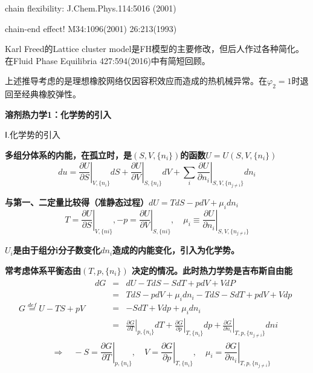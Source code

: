 \documentclass{article} %
\begin{document}
\noindent chain flexibility: J.Chem.Phys.114:5016 (2001)

\noindent chain-end effect! M34:1096(2001) 26:213(1993)

\noindent Karl Freed的Lattice cluster model是FH模型的主要修改，但后人作过各种简化。在Fluid Phase Equilibria 427:594(2016)中有简短回顾。

\noindent 

\noindent 上述推导考虑的是理想橡胶网络仅因容积效应而造成的热机械异常。在$\varphi _{2} =1$时退回至经典橡胶弹性。

\noindent \eject 

\noindent \textbf{溶剂热力学1：化学势的引入}

\noindent Ⅰ.化学势的引入


{\bf  多组分体系的内能，在孤立时，是$(S,V,\{ n_{i} \} )$的函数$U=U(S,V,\{ n_{i} \} )$
\[du=\left. \frac{\partial U}{\partial S} \right|_{V,\{ n_{i} \} } dS+\left. \frac{\partial U}{\partial V} \right|_{S,\{ n_{i} \} } dV+\sum _{i}\left. \frac{\partial U}{\partial n_{i} } \right|_{S,V,\{ n_{j\ne i} \} } dn_{i}  \] }

{\bf 与第一、二定量比较得（准静态过程）$dU=TdS-pdV+\mu _{i} dn_{i} $
\[T=\left. \frac{\partial U}{\partial S} \right|_{V,\{ ni\} } ,-p=\left. \frac{\partial U}{\partial V} \right|_{S,\{ ni\} } ,\quad \mu _{i} \equiv \left. \frac{\partial U}{\partial n_{i} } \right|_{S,V,\{ n_{j\ne i} \} } \] }

{\bf $U_{i} $是由于组分i分子数变化$dn_{i} $造成的内能变化，引入为化学势。}


{\bf  常考虑体系平衡态由$(T,p,\{ n_{i} \} )$ 决定的情况。此时热力学势是吉布斯自由能
\[\begin{array}{cc} {G{\mathop{=}\limits^{def}} U-TS+pV} & {\begin{array}{rcl} {dG} & {=} & {dU-TdS-SdT+pdV+VdP} \\ {} & {=} & {TdS-pdV+\mu _{i} dn_{i} -TdS-SdT+pdV+Vdp} \\ {} & {=} & {-SdT+Vdp+\mu _{i} dn_{i} } \\ {} & {=} & {\left. \frac{\partial G}{\partial T} \right|_{p,\{ n_{i} \} } dT+\left. \frac{\partial G}{\partial p} \right|_{T,\{ n_{i} \} } dp+\left. \frac{\partial G}{\partial n_{i} } \right|_{T,p,\{ n_{j\ne i} \} } dni} \end{array}} \end{array}\] 
\[\quad \Rightarrow \quad -S=\left. \frac{\partial G}{\partial T} \right|_{p,\{ n_{i} \} } ,\quad V=\left. \frac{\partial G}{\partial p} \right|_{T,\{ n_{i} \} } ,\quad \mu _{i} =\left. \frac{\partial G}{\partial n_{i} } \right|_{T,p,\{ n_{j\ne i} \} } \] }
\end{document}
